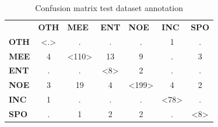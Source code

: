 \documentclass[
10pt, %
a4paper, %
oneside, %
headinclude,footinclude, %
BCOR5mm, %
]{scrartcl}
\begin{document}
\begin{table}[h]
 \centering
\caption[Confusion matrix devset annotation]{Confusion matrix test dataset annotation }
\begin{tabular}{lcccccc}
                                  & \multicolumn{1}{l}{\textbf{OTH}}            & \multicolumn{1}{l}{\textbf{MEE}}              & \multicolumn{1}{l}{\textbf{ENT}}            & \multicolumn{1}{l}{\textbf{NOE}}              & \multicolumn{1}{l}{\textbf{INC}}             & \multicolumn{1}{l}{\textbf{SPO}}    \\ \cline{2-7} 
\multicolumn{1}{l|}{\textbf{OTH}} & \multicolumn{1}{c|}{\textless.\textgreater} & \multicolumn{1}{c|}{.}                        & \multicolumn{1}{c|}{.}                      & \multicolumn{1}{c|}{.}                        & \multicolumn{1}{c|}{1}                       & \multicolumn{1}{c|}{.}              \\ \cline{2-7} 
\multicolumn{1}{l|}{\textbf{MEE}} & \multicolumn{1}{c|}{4}                      & \multicolumn{1}{c|}{\textless110\textgreater} & \multicolumn{1}{c|}{13}                     & \multicolumn{1}{c|}{9}                        & \multicolumn{1}{c|}{.}                       & \multicolumn{1}{c|}{3}              \\ \cline{2-7} 
\multicolumn{1}{l|}{\textbf{ENT}} & \multicolumn{1}{c|}{.}                      & \multicolumn{1}{c|}{.}                        & \multicolumn{1}{c|}{\textless8\textgreater} & \multicolumn{1}{c|}{2}                        & \multicolumn{1}{c|}{.}                       & \multicolumn{1}{c|}{.}              \\ \cline{2-7} 
\multicolumn{1}{l|}{\textbf{NOE}} & \multicolumn{1}{c|}{3}                      & \multicolumn{1}{c|}{19}                       & \multicolumn{1}{c|}{4}                      & \multicolumn{1}{c|}{\textless199\textgreater} & \multicolumn{1}{c|}{4}                       & \multicolumn{1}{c|}{2}              \\ \cline{2-7} 
\multicolumn{1}{l|}{\textbf{INC}} & \multicolumn{1}{c|}{1}                      & \multicolumn{1}{c|}{.}                        & \multicolumn{1}{c|}{.}                      & \multicolumn{1}{c|}{.}                        & \multicolumn{1}{c|}{\textless78\textgreater} & \multicolumn{1}{c|}{.}              \\ \cline{2-7} 
\multicolumn{1}{l|}{\textbf{SPO}} & \multicolumn{1}{c|}{.}                      & \multicolumn{1}{c|}{1}                        & \multicolumn{1}{c|}{2}                      & \multicolumn{1}{c|}{2}                        & \multicolumn{1}{c|}{.}                       & \multicolumn{1}{c|}{\textless8\textgreater} \\ \cline{2-7} 
\end{tabular}

\end{table}
\end{document}
